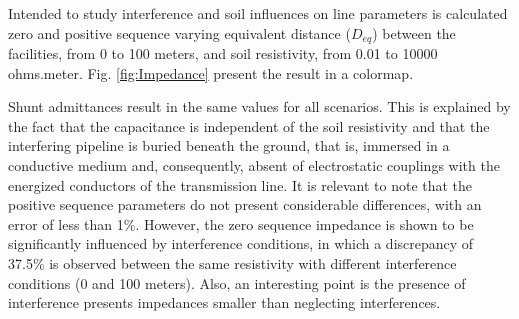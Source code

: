 \documentclass[conference]{IEEEtran}
\begin{document}

Intended to study interference and soil influences on line parameters is calculated zero and positive sequence varying  equivalent distance ($D_{eq}$) between the facilities, from 0 to 100 meters, and soil resistivity, from 0.01 to 10000 ohms.meter. Fig. \ref{fig:Impedance} present the result in a colormap.

Shunt admittances result in the same values for all scenarios. This is explained by the fact that the capacitance is independent of the soil resistivity and that the interfering pipeline is buried beneath the ground, that is, immersed in a conductive medium and, consequently, absent of electrostatic couplings with the energized conductors of the transmission line. It is relevant to note that the positive sequence parameters do not present considerable differences, with an error of less than 1\%. However, the zero sequence impedance is shown to be significantly influenced by interference conditions, in which a discrepancy of 37.5\% is observed between the same resistivity with different interference conditions (0 and 100 meters). Also, an interesting point is the presence of interference presents impedances smaller than neglecting interferences.
 
\end{document}
